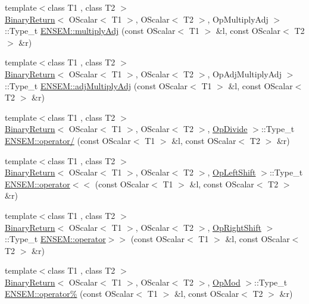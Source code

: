 \begin{DoxyCompactItemize}
\item 
{\footnotesize template$<$class T1 , class T2 $>$ }\\\mbox{\hyperlink{structBinaryReturn}{Binary\+Return}}$<$ O\+Scalar$<$ T1 $>$, O\+Scalar$<$ T2 $>$, Op\+Multiply\+Adj $>$\+::Type\+\_\+t \mbox{\hyperlink{group__obsscalar_ga0549c309e400fa9b2c660bdec29e7f91}{E\+N\+S\+E\+M\+::multiply\+Adj}} (const O\+Scalar$<$ T1 $>$ \&l, const O\+Scalar$<$ T2 $>$ \&r)
\item 
{\footnotesize template$<$class T1 , class T2 $>$ }\\\mbox{\hyperlink{structBinaryReturn}{Binary\+Return}}$<$ O\+Scalar$<$ T1 $>$, O\+Scalar$<$ T2 $>$, Op\+Adj\+Multiply\+Adj $>$\+::Type\+\_\+t \mbox{\hyperlink{group__obsscalar_ga53406445c0fa210f9ed3a41ab077b31e}{E\+N\+S\+E\+M\+::adj\+Multiply\+Adj}} (const O\+Scalar$<$ T1 $>$ \&l, const O\+Scalar$<$ T2 $>$ \&r)
\item 
{\footnotesize template$<$class T1 , class T2 $>$ }\\\mbox{\hyperlink{structBinaryReturn}{Binary\+Return}}$<$ O\+Scalar$<$ T1 $>$, O\+Scalar$<$ T2 $>$, \mbox{\hyperlink{structOpDivide}{Op\+Divide}} $>$\+::Type\+\_\+t \mbox{\hyperlink{group__obsscalar_gadc02b34a3b7610b73a4ab6d413f19c17}{E\+N\+S\+E\+M\+::operator/}} (const O\+Scalar$<$ T1 $>$ \&l, const O\+Scalar$<$ T2 $>$ \&r)
\item 
{\footnotesize template$<$class T1 , class T2 $>$ }\\\mbox{\hyperlink{structBinaryReturn}{Binary\+Return}}$<$ O\+Scalar$<$ T1 $>$, O\+Scalar$<$ T2 $>$, \mbox{\hyperlink{structOpLeftShift}{Op\+Left\+Shift}} $>$\+::Type\+\_\+t \mbox{\hyperlink{group__obsscalar_ga4e9caae1c3f8de5f5a7066462fdbd391}{E\+N\+S\+E\+M\+::operator$<$$<$}} (const O\+Scalar$<$ T1 $>$ \&l, const O\+Scalar$<$ T2 $>$ \&r)
\item 
{\footnotesize template$<$class T1 , class T2 $>$ }\\\mbox{\hyperlink{structBinaryReturn}{Binary\+Return}}$<$ O\+Scalar$<$ T1 $>$, O\+Scalar$<$ T2 $>$, \mbox{\hyperlink{structOpRightShift}{Op\+Right\+Shift}} $>$\+::Type\+\_\+t \mbox{\hyperlink{group__obsscalar_ga015e8600020030e6443b821a8064e644}{E\+N\+S\+E\+M\+::operator$>$$>$}} (const O\+Scalar$<$ T1 $>$ \&l, const O\+Scalar$<$ T2 $>$ \&r)
\item 
{\footnotesize template$<$class T1 , class T2 $>$ }\\\mbox{\hyperlink{structBinaryReturn}{Binary\+Return}}$<$ O\+Scalar$<$ T1 $>$, O\+Scalar$<$ T2 $>$, \mbox{\hyperlink{structOpMod}{Op\+Mod}} $>$\+::Type\+\_\+t \mbox{\hyperlink{group__obsscalar_ga8cba513c40a3014718affb28b883351e}{E\+N\+S\+E\+M\+::operator\%}} (const O\+Scalar$<$ T1 $>$ \&l, const O\+Scalar$<$ T2 $>$ \&r)

\end{DoxyCompactItemize}
